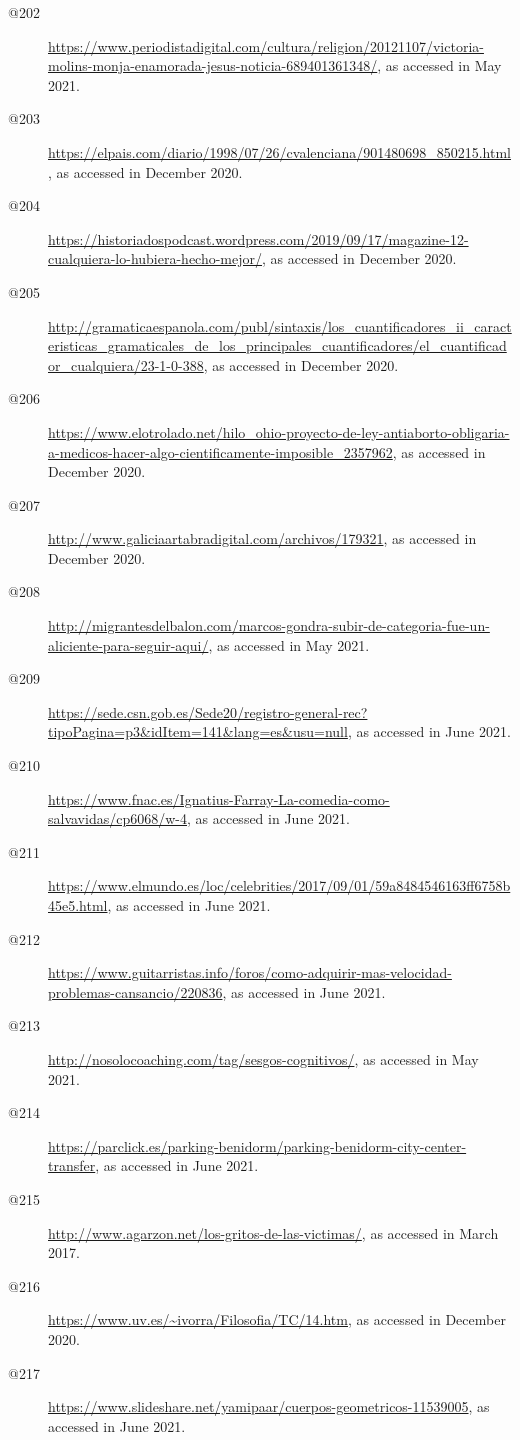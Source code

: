 \begin{flushleft}
\begin{description}
\item[@202]\url{https://www.periodistadigital.com/cultura/religion/20121107/victoria-molins-monja-enamorada-jesus-noticia-689401361348/}, as accessed in May 2021.
\item[@203]\url{https://elpais.com/diario/1998/07/26/cvalenciana/901480698_850215.html}, as accessed in December 2020.
\item[@204]
\url{https://historiadospodcast.wordpress.com/2019/09/17/magazine-12-cualquiera-lo-hubiera-hecho-mejor/}, as accessed in December 2020.
\item[@205]\url{http://gramaticaespanola.com/publ/sintaxis/los_cuantificadores_ii_caracteristicas_gramaticales_de_los_principales_cuantificadores/el_cuantificador_cualquiera/23-1-0-388}, as accessed in December 2020.
\item[@206]\url{https://www.elotrolado.net/hilo_ohio-proyecto-de-ley-antiaborto-obligaria-a-medicos-hacer-algo-cientificamente-imposible_2357962}, as accessed in December 2020.
\item[@207]\url{http://www.galiciaartabradigital.com/archivos/179321}, as accessed in December 2020.
\item[@208]\url{http://migrantesdelbalon.com/marcos-gondra-subir-de-categoria-fue-un-aliciente-para-seguir-aqui/}, as accessed in May 2021.
\item[@209]\url{https://sede.csn.gob.es/Sede20/registro-general-rec?tipoPagina=p3&idItem=141&lang=es&usu=null}, as accessed in June 2021.
\item[@210]\url{https://www.fnac.es/Ignatius-Farray-La-comedia-como-salvavidas/cp6068/w-4}, as accessed in June 2021.
\item[@211]\url{https://www.elmundo.es/loc/celebrities/2017/09/01/59a8484546163ff6758b45e5.html}, as accessed in June 2021.
\item[@212]\url{https://www.guitarristas.info/foros/como-adquirir-mas-velocidad-problemas-cansancio/220836}, as accessed in June 2021.
\item[@213]\url{http://nosolocoaching.com/tag/sesgos-cognitivos/}, as accessed in May 2021.
\item[@214]\url{https://parclick.es/parking-benidorm/parking-benidorm-city-center-transfer}, as accessed in June 2021.
\item[@215]\url{http://www.agarzon.net/los-gritos-de-las-victimas/}, as accessed in March 2017.
\item[@216]\url{https://www.uv.es/~ivorra/Filosofia/TC/14.htm}, as accessed in December 2020.
\item[@217]\url{https://www.slideshare.net/yamipaar/cuerpos-geometricos-11539005}, as accessed in June 2021.

\end{description}
\end{flushleft}
